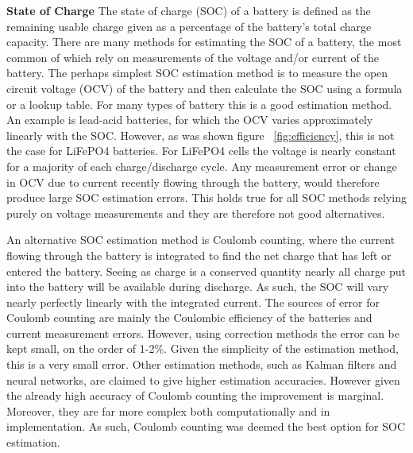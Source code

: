 \documentclass[a4paper]{article}
\begin{document}
\textbf{State of Charge}
\vspace{10pt} 
\newline
The state of charge (SOC) of a battery is defined as the remaining usable charge 
given as a percentage of the battery’s total charge capacity\cite{DICKINSON2009452}. There are many 
methods for  estimating the SOC of a battery, the most common of which rely on 
measurements of the voltage and/or current of the battery\cite{DANKO2019186}. The perhaps 
simplest SOC estimation method is to measure the open circuit voltage (OCV) 
of the battery and then calculate the SOC using a formula or a lookup table. 
For many types of battery this is a good estimation method. An example is 
lead-acid batteries, for which the OCV varies approximately linearly with the 
SOC. However, as was shown figure ~\ref{fig:efficiency}, this is not the case 
for LiFePO4 batteries. For LiFePO4 cells the voltage is nearly constant for 
a majority of each charge/discharge cycle. Any measurement error or change in 
OCV due to current recently flowing through the battery, would therefore produce large 
SOC estimation errors. This holds true for all SOC methods relying purely on 
voltage measurements and they are therefore not good alternatives. 

An alternative SOC estimation method is Coulomb counting, where the current 
flowing through the battery is integrated to find the net charge that has 
left or entered the battery. Seeing as charge is a conserved quantity nearly 
all charge put into the battery will be available during discharge. As such, 
the SOC will vary nearly perfectly linearly with the integrated current. 
The sources of error for Coulomb counting are mainly the Coulombic efficiency 
of the batteries and current measurement errors. However, using correction 
methods the error can be kept small, on the order of 1-2\%\cite{NG20091506}. Given the 
simplicity of the estimation method, this is a very small error. Other 
estimation methods, such as Kalman filters and neural networks, are claimed 
to give higher estimation accuracies\cite{DANKO2019186}. However given the already high 
accuracy of Coulomb counting the improvement is marginal. Moreover, they 
are far more complex both computationally and in implementation. As such, 
Coulomb counting was deemed the best option for SOC estimation.
\end{document}
